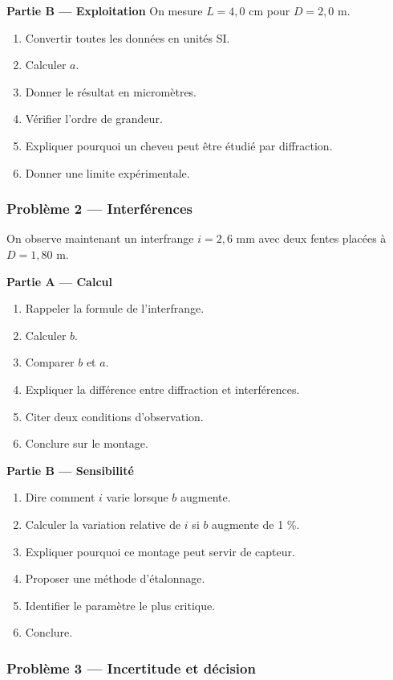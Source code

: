 \documentclass[11pt,a4paper]{article}
\begin{document}
\begin{difficile}
\textbf{Partie B — Exploitation}
On mesure $L=4{,}0$ cm pour $D=2{,}0$ m.
\begin{enumerate}
  \item Convertir toutes les données en unités SI.
  \item Calculer $a$.
  \item Donner le résultat en micromètres.
  \item Vérifier l'ordre de grandeur.
  \item Expliquer pourquoi un cheveu peut être étudié par diffraction.
  \item Donner une limite expérimentale.
\end{enumerate}

\subsubsection*{Problème 2 — Interférences}

On observe maintenant un interfrange $i=2{,}6$ mm avec deux fentes placées à $D=1{,}80$ m.

\textbf{Partie A — Calcul}
\begin{enumerate}
  \item Rappeler la formule de l'interfrange.
  \item Calculer $b$.
  \item Comparer $b$ et $a$.
  \item Expliquer la différence entre diffraction et interférences.
  \item Citer deux conditions d'observation.
  \item Conclure sur le montage.
\end{enumerate}

\textbf{Partie B — Sensibilité}
\begin{enumerate}
  \item Dire comment $i$ varie lorsque $b$ augmente.
  \item Calculer la variation relative de $i$ si $b$ augmente de 1 \%.
  \item Expliquer pourquoi ce montage peut servir de capteur.
  \item Proposer une méthode d'étalonnage.
  \item Identifier le paramètre le plus critique.
  \item Conclure.
\end{enumerate}

\subsubsection*{Problème 3 — Incertitude et décision}


\end{difficile}
\end{document}
